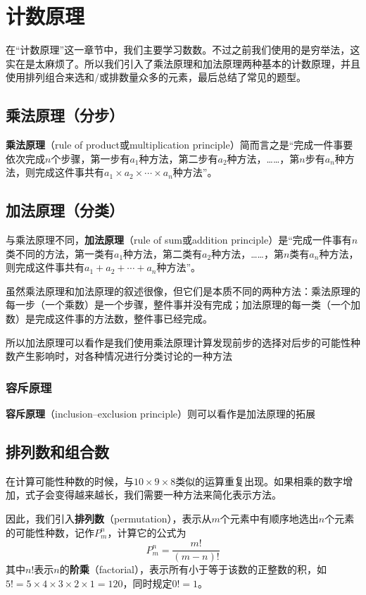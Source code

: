 \chapter{计数原理}
在“计数原理”这一章节中，我们主要学习数数。不过之前我们使用的是穷举法，这实在是太麻烦了。所以我们引入了乘法原理和加法原理两种基本的计数原理，并且使用排列组合来选和/或排数量众多的元素，最后总结了常见的题型。

\section[乘法原理]{乘法原理（分步）}
\textbf{乘法原理}（rule of product或multiplication principle）简而言之是“完成一件事要依次完成$n$个步骤，第一步有$a_1$种方法，第二步有$a_2$种方法，\ldots\ldots，第$n$步有$a_n$种方法，则完成这件事共有$a_1\times a_2 \times\cdots\times a_n$种方法”。

\section[加法原理]{加法原理（分类）}
与乘法原理不同，\textbf{加法原理}（rule of sum或addition principle）是“完成一件事有$n$类不同的方法，第一类有$a_1$种方法，第二类有$a_2$种方法，\ldots\ldots，第$n$类有$a_n$种方法，则完成这件事共有$a_1+a_2+\cdots+a_n$种方法”。

虽然乘法原理和加法原理的叙述很像，但它们是本质不同的两种方法：乘法原理的每一步（一个乘数）是一个步骤，整件事并没有完成；加法原理的每一类（一个加数）是完成这件事的方法数，整件事已经完成。

所以加法原理可以看作是我们使用乘法原理计算发现前步的选择对后步的可能性种数产生影响时，对各种情况进行分类讨论的一种方法

\subsection{容斥原理}
\textbf{容斥原理}（inclusion–exclusion principle）则可以看作是加法原理的拓展

\section{排列数和组合数}
在计算可能性种数的时候，与$10\times 9\times 8$类似的运算重复出现。如果相乘的数字增加，式子会变得越来越长，我们需要一种方法来简化表示方法。

因此，我们引入\textbf{排列数}（permutation），表示从$m$个元素中有顺序地选出$n$个元素的可能性种数，记作$P_m^n$，计算它的公式为\[P_m^n=\frac{m!}{(m-n)!}\]其中$n!$表示$n$的\textbf{阶乘}（factorial），表示所有小于等于该数的正整数的积，如$5!=5\times 4\times 3\times 2\times 1=120$，同时规定$0!=1$。

